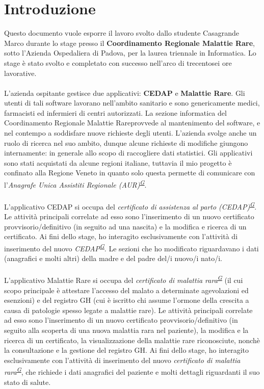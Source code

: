 \documentclass[a4paper]{article}
\newcommand{\crmr}{Coordinamento Regionale Malattie Rare}
\begin{document}
\section{Introduzione}
Questo documento vuole esporre il lavoro svolto dallo studente Casagrande Marco durante lo stage presso il \textbf{\crmr}, sotto l'Azienda Ospedaliera di Padova, per la laurea triennale in Informatica. Lo stage è stato svolto e completato con successo nell'arco di trecentosei ore lavorative.
\\ \\
L'azienda ospitante gestisce due applicativi: \textbf{CEDAP} e \textbf{Malattie Rare}. Gli utenti di tali software lavorano nell'ambito sanitario e sono genericamente medici, farmacisti ed infermieri di centri autorizzati. La sezione informatica del \crmr provvede al mantenimento del software, e nel contempo a soddisfare nuove richieste degli utenti. L'azienda svolge anche un ruolo di ricerca nel suo ambito, dunque alcune richieste di modifiche giungono internamente: in generale allo scopo di raccogliere dati statistici. Gli applicativi sono stati acquistati da alcune regioni italiane, tuttavia il mio progetto è confinato alla Regione Veneto in quanto solo questa permette di comunicare con l'\textit{Anagrafe Unica Assistiti Regionale (AUR)\textsuperscript{\hyperref[sec:gl]{G}}}.
\\ \\
L'applicativo CEDAP si occupa del \textit{certificato di assistenza al parto (CEDAP)\textsuperscript{\hyperref[sec:gl]{G}}}. Le attività principali correlate ad esso sono l'inserimento di un nuovo certificato provvisorio/definitivo (in seguito ad una nascita) e la modifica e ricerca di un certificato. Ai fini dello stage, ho interagito esclusivamente con l'attività di inserimento del nuovo \textit{CEDAP\textsuperscript{\hyperref[sec:gl]{G}}}. Le sezioni che ho modificato riguardavano i dati (anagrafici e molti altri) della madre e del padre del/i nuovo/i nato/i.
\\ \\
L'applicativo Malattie Rare si occupa del \textit{certificato di malattia rara\textsuperscript{\hyperref[sec:gl]{G}}} (il cui scopo principale è attestare l'accesso del malato a determinate agevolazioni ed esenzioni) e del registro GH (cui è iscritto chi assume l'ormone della crescita a causa di patologie spesso legate a malattie rare). Le attività principali correlate ad esso sono l'inserimento di un nuovo certificato provvisorio/definitivo (in seguito alla scoperta di una nuova malattia rara nel paziente), la modifica e la ricerca di un certificato, la visualizzazione della malattie rare riconosciute, nonchè la consultazione e la gestione del registro GH. Ai fini dello stage, ho interagito esclusivamente con l'attività di inserimento del nuovo \textit{certificato di malattia rara\textsuperscript{\hyperref[sec:gl]{G}}}, che richiede i dati anagrafici del paziente e molti dettagli riguardanti il suo stato di salute.
\end{document}
